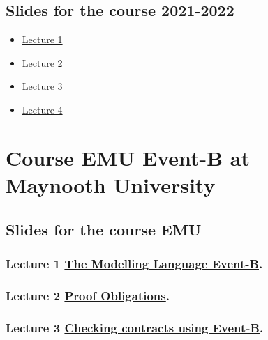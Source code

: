 \documentclass[ 12pt]{article}
\begin{document}
\subsection{Slides for the course 2021-2022}

\begin{itemize}
\item[]  
  \href{http://mery54.github.io/teaching/mosos/lecturesnotes/2021-22-MLS-00.pdf}{Lecture
    1 }
\item[]  
  \href{http://mery54.github.io/teaching/mosos/lecturesnotes/2021-22-MLS-01.pdf}{Lecture
    2 }
  \item[]  
  \href{http://mery54.github.io/teaching/mosos/lecturesnotes/2021-22-MLS-02.pdf}{Lecture
    3 }
  \item[]  
  \href{http://mery54.github.io/teaching/mosos/lecturesnotes/2021-22-MLS-03.pdf}{Lecture 4 }
\end{itemize}



\section{Course  EMU  Event-B  at Maynooth University}
\label{sec:course-mcfsi-at}


\subsection{Slides for the course EMU}
\label{sec:slides}



\subsubsection{Lecture 1
  \href{http://mery54.github.io/teaching/mosos/lecturesnotes/mcfsi-maynooth-lect1.pdf}{The 
    Modelling Language Event-B}. 
}


\subsubsection{Lecture 2
    \href{http://mery54.github.io/teaching/mosos/lecturesnotes/mcfsi-maynooth-po.pdf}{Proof
      Obligations}.}


  
\subsubsection{Lecture 3
    \href{http://mery54.github.io/teaching/mosos/lecturesnotes/mcfsi-maynooth-verification.pdf}{Checking
      contracts using Event-B}.}
\end{document}
